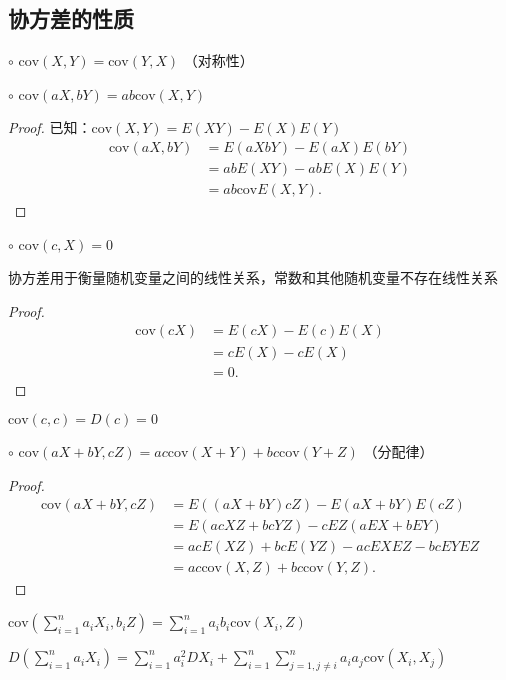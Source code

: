 \subsection{协方差的性质}%
\label{sub:协方差的性质}
$\circ$ $\text{cov}\left( X,Y \right) =\text{cov}\left( Y,X \right) $ （对称性）

$\circ$ $\text{cov}\left( aX,bY \right) =ab\text{cov}\left( X,Y \right) $ 
\begin{proof}
    已知：$\text{cov}\left( X,Y \right) =E\left( XY \right) -E\left( X \right) E\left( Y \right) $
    \begin{align*}
        \text{cov}\left( aX,bY \right) &=E\left( aXbY \right) -E\left( aX \right) E\left( bY \right) \\
        &= abE\left( XY \right) -abE\left( X \right) E\left( Y \right)  \\
        &= ab\text{cov}E\left( X,Y \right)
    .\end{align*}
\end{proof}

$\circ$ $\text{cov}\left( c,X \right) =0$ 
\begin{notation}
    协方差用于衡量随机变量之间的线性关系，常数和其他随机变量不存在线性关系
\end{notation}
\begin{proof}
    \begin{align*}
        \text{cov}\left( cX \right) &= E\left( cX \right) -E\left( c \right) E\left( X \right)  \\
        &= cE\left( X \right) -cE\left( X \right)  \\
        &= 0
    .\end{align*}
\end{proof}
\begin{notation}
    $\text{cov}\left( c,c \right) =D\left( c \right) =0$
\end{notation}

$\circ$ $\text{cov}\left( aX+bY ,cZ\right) =ac\text{cov}\left( X+Y \right) +bc\text{cov}\left( Y+Z \right) $ （分配律）
\begin{proof}
    \begin{align*}
        \text{cov}\left( aX+bY,cZ \right) &=E\left( \left( aX+bY \right) cZ \right) -E\left( aX+bY \right) E\left( cZ \right) \\
        &= E\left( acXZ+bcYZ \right) -cEZ\left( aEX+bEY \right)  \\
        &= acE\left( XZ \right) +bcE\left( YZ \right) -acEXEZ-bcEYEZ \\
        &= ac\text{cov}\left( X,Z \right) +bc\text{cov}\left( Y,Z \right)
    .\end{align*}
\end{proof}
\begin{notation}
    $\displaystyle{\text{cov}\left( \sum_{i=1}^{n}a_iX_i,b_iZ\right) =\sum_{i=1}^{n} a_ib_i\text{cov}\left( X_i,Z \right) }$
\end{notation}
\begin{notation}
    $\displaystyle{D\left( \sum_{i=1}^{n} a_iX_i \right) =\sum_{i=1}^{n} a_i^2DX_i+\sum_{i=1}^{n} \sum_{j=1,j\neq i}^{n} a_ia_j\text{cov}\left( X_i,X_j \right) }$
\end{notation}

